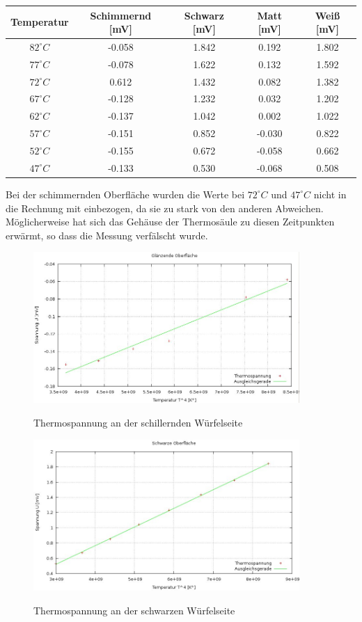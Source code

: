 \begin{table}[H]
\begin{tabular}{|c|c|c|c|c|}
\hline 
Temperatur & Schimmernd [mV] & Schwarz [mV]& Matt [mV]& Weiß [mV]\\ 
\hline 
$82^\circ C$&-0.058	&1.842	&0.192	&1.802\\
\hline
$77^\circ C$&-0.078	&1.622	&0.132	&1.592\\
\hline
$72^\circ C$&0.612	&1.432	&0.082	&1.382\\
\hline
$67^\circ C$&-0.128	&1.232	&0.032	&1.202\\
\hline
$62^\circ C$&-0.137	&1.042	&0.002	&1.022\\
\hline
$57^\circ C$&-0.151	&0.852	&-0.030	&0.822\\
\hline
$52^\circ C$&-0.155	&0.672	&-0.058	&0.662\\
\hline
$47^\circ C$&-0.133	&0.530	&-0.068	&0.508\\ 
\hline
\end{tabular} 
\end{table}
Bei der schimmernden Oberfläche wurden die Werte bei $72^\circ C$ und $47^\circ C$ nicht in die Rechnung mit einbezogen, da sie zu stark von den anderen Abweichen. Möglicherweise hat sich das Gehäuse der Thermosäule zu diesen Zeitpunkten erwärmt, so dass die Messung verfälscht wurde.


\begin{figure}[H]
\includegraphics[width=0.9\textwidth]{pics/temp_schillernd.jpg}
\label{abstand}
\caption{Thermospannung an der schillernden Würfelseite}
\end{figure}

\begin{figure}[H]
\includegraphics[width=0.9\textwidth]{pics/temp_schw.jpg}
\label{abstand}
\caption{Thermospannung an der schwarzen Würfelseite}
\end{figure}

